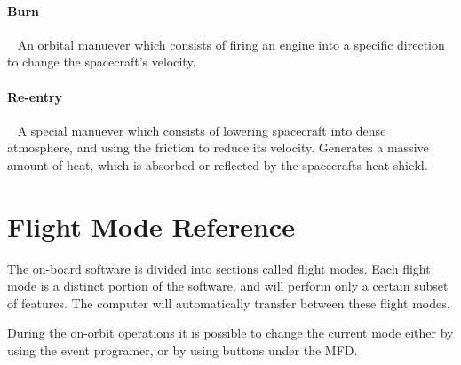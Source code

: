 \paragraph{Burn}~
An orbital manuever which consists of firing an engine into a specific direction to change the spacecraft's velocity.

\paragraph{Re-entry}~
A special manuever which consists of lowering spacecraft into dense atmosphere, and using the friction to reduce its velocity. Generates a massive amount of heat, which is absorbed or reflected by the spacecrafts heat shield.


\onecolumn
\section{Flight Mode Reference}
The on-board software is divided into sections called flight modes. Each flight mode is a distinct portion of the software, and will perform only a certain subset of features. The computer will automatically transfer between these flight modes.

During the on-orbit operations it is possible to change the current mode either by using the event programer, or by using buttons under the MFD.

